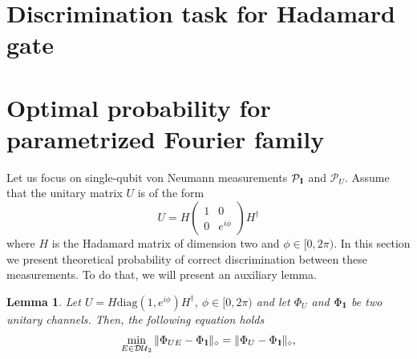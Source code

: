 \documentclass[preprint,12pt, a4paper, dvipsnames]{elsarticle}
\newcommand{\1}{{\rm 1\hspace{-0.9mm}l}}
\newcommand{\Id}{{\rm 1\hspace{-0.9mm}l}}
\newcommand{\ee}{\ensuremath{\mathrm{e}}}
\newcommand{\ii}{\ensuremath{\mathrm{i}}}
\newcommand{\PP}{\mathcal{P}}
\newcommand{\diaguni}{\ensuremath{\mathcal{DU}}}
\newcommand{\diag}{\mathrm{diag}}
\newtheorem{lemma}{Lemma}
\begin{document}
\section{Discrimination task for Hadamard gate}\label{app:hadamard}
\todo[inline]{!!!!!!}

\section{Optimal probability for parametrized Fourier family} \label{app:optimal-probability}


Let us focus on single-qubit von Neumann measurements $\PP_\1$ and $\PP_U$.
Assume that the unitary matrix $U$ is of the form
\begin{equation}
U = H
\left(\begin{array}{cc}1&0\\0&e^{i \phi}\end{array}\right)  H^\dagger
\end{equation}
where $H$ is the Hadamard matrix of dimension two and $\phi \in [0, 2 \pi)$.
In this section we present theoretical probability of correct
discrimination between these measurements. To do that, we will present an auxiliary lemma.
\begin{lemma}\label{lemma:min-e-optimal}
	Let $U = H \diag(1, e^{i \phi}) H^\dagger$, $\phi \in [0, 2\pi)$ and	let
	$\Phi_U$ and $\Phi_\Id$ be two unitary channels. Then, the following equation holds
	\begin{equation}
	\min_{E \in \diaguni_2} \|\Phi_{UE} -
	\Phi_\Id\|_\diamond = \|\Phi_{U} -
	\Phi_\Id\|_\diamond,
	\end{equation}
\end{lemma}
\end{document}
